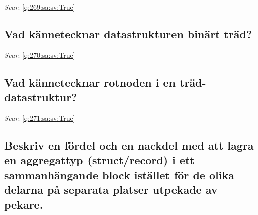 \documentclass[a4paper,11pt,oneside]{article}
\begin{document}
\begin{sloppypar}
\label{q:269:sa:sv:False}

\vspace{2cm}

\noindent\makebox[\textwidth]{\hrulefill}

\vspace{1cm}

\textit{Svar}: \autoref{q:269:sa:sv:True}



\subsection{Vad k\"annetecknar datastrukturen bin\"art tr\"ad?}

\label{q:270:sa:sv:False}

\vspace{2cm}

\noindent\makebox[\textwidth]{\hrulefill}

\vspace{1cm}

\textit{Svar}: \autoref{q:270:sa:sv:True}



\subsection{Vad k\"annetecknar rotnoden i en tr\"ad-datastruktur?}

\label{q:271:sa:sv:False}

\vspace{2cm}

\noindent\makebox[\textwidth]{\hrulefill}

\vspace{1cm}

\textit{Svar}: \autoref{q:271:sa:sv:True}



\subsection{Beskriv en f\"ordel och en nackdel med att lagra en aggregattyp (struct/record) i ett sammanh\"angande block ist\"allet f\"or de olika delarna p\r{a} separata platser utpekade av pekare.}

\label{q:272:sa:sv:False}

\vspace{2cm}

\noindent\makebox[\textwidth]{\hrulefill}

\vspace{1cm}


\end{sloppypar}
\end{document}
